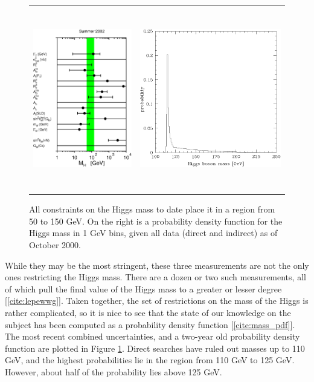 \documentclass[12pt]{article}
\begin{document}
\begin{figure}
  \begin{center}
    \begin{tabular}{l r}
      \includegraphics[height=8cm]{s02_show_higgs.eps} &
      \includegraphics[height=8cm]{mass_pdf.eps} \\
    \end{tabular}
  \end{center}

  \caption{All constraints on the Higgs mass to date place it in a
  region from 50 to 150 GeV. On the right is a probability density
  function for the Higgs mass in 1 GeV bins, given all data (direct
  and indirect) as of October 2000.}

  \label{fig:mass_pdf}
\end{figure}

While they may be the most stringent, these three measurements are not
the only ones restricting the Higgs mass. There are a dozen or two
such measurements, all of which pull the final value of the Higgs mass
to a greater or lesser degree [\ref{cite:lepewwg}]. Taken together,
the set of restrictions on the mass of the Higgs is rather
complicated, so it is nice to see that the state of our knowledge on
the subject has been computed as a probability density function
[\ref{cite:mass_pdf}]. The most recent combined uncertainties, and a
two-year old probability density function are plotted in Figure
\ref{fig:mass_pdf}. Direct searches have ruled out masses up to 110
GeV, and the highest probabilities lie in the region from 110 GeV to
125 GeV. However, about half of the probability lies above 125 GeV.
\end{document}
